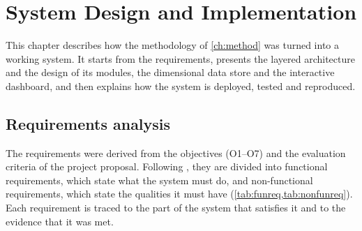 \chapter{System Design and Implementation}\label{ch:system}

This chapter describes how the methodology of \cref{ch:method} was turned into a working system. It starts from
the requirements, presents the layered architecture and the design of its modules, the dimensional data store
and the interactive dashboard, and then explains how the system is deployed, tested and reproduced.

\section{Requirements analysis}
The requirements were derived from the objectives (O1--O7) and the evaluation criteria of the project proposal.
Following \citet{sommerville2016}, they are divided into functional requirements, which state what the system
must do, and non-functional requirements, which state the qualities it must have
(\cref{tab:funreq,tab:nonfunreq}). Each requirement is traced to the part of the system that satisfies it and to
the evidence that it was met.

